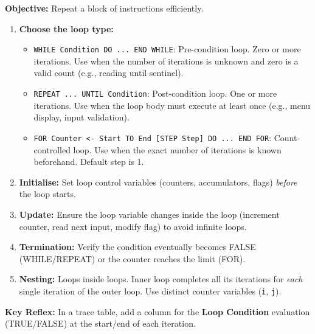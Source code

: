 \documentclass[11pt]{article}
\newcommand{\cle}[1]{{\popxbold\color{popdark}#1}}
\begin{document}
\begin{methode}
\textbf{Objective:} Repeat a block of instructions efficiently.
\begin{enumerate}
    \item \textbf{Choose the loop type:}
        \begin{itemize}
            \item \texttt{WHILE Condition DO ... END WHILE}: \cle{Pre-condition} loop. Zero or more iterations. Use when the number of iterations is unknown and zero is a valid count (e.g., reading until sentinel).
            \item \texttt{REPEAT ... UNTIL Condition}: \cle{Post-condition} loop. One or more iterations. Use when the loop body must execute at least once (e.g., menu display, input validation).
            \item \texttt{FOR Counter <- Start TO End [STEP Step] DO ... END FOR}: \cle{Count-controlled} loop. Use when the exact number of iterations is known beforehand. Default step is 1.
        \end{itemize}
    \item \textbf{Initialise:} Set loop control variables (counters, accumulators, flags) \emph{before} the loop starts.
    \item \textbf{Update:} Ensure the loop variable changes inside the loop (increment counter, read next input, modify flag) to avoid \cle{infinite loops}.
    \item \textbf{Termination:} Verify the condition eventually becomes FALSE (WHILE/REPEAT) or the counter reaches the limit (FOR).
    \item \textbf{Nesting:} Loops inside loops. Inner loop completes all its iterations for \emph{each} single iteration of the outer loop. Use distinct counter variables (\texttt{i}, \texttt{j}).
\end{enumerate}
\textbf{Key Reflex:} In a trace table, add a column for the \textbf{Loop Condition} evaluation (TRUE/FALSE) at the start/end of each iteration.
\end{methode}
\end{document}
